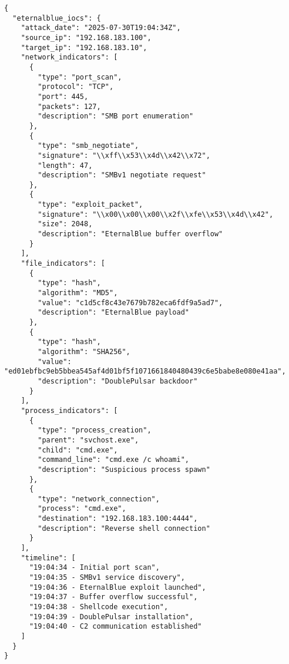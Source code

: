 \begin{lstlisting}[style=jsstyle,caption=IOCs extraits lors des tests EternalBlue]
{
  "eternalblue_iocs": {
    "attack_date": "2025-07-30T19:04:34Z",
    "source_ip": "192.168.183.100",
    "target_ip": "192.168.183.10",
    "network_indicators": [
      {
        "type": "port_scan",
        "protocol": "TCP",
        "port": 445,
        "packets": 127,
        "description": "SMB port enumeration"
      },
      {
        "type": "smb_negotiate",
        "signature": "\\xff\\x53\\x4d\\x42\\x72",
        "length": 47,
        "description": "SMBv1 negotiate request"
      },
      {
        "type": "exploit_packet",
        "signature": "\\x00\\x00\\x00\\x2f\\xfe\\x53\\x4d\\x42",
        "size": 2048,
        "description": "EternalBlue buffer overflow"
      }
    ],
    "file_indicators": [
      {
        "type": "hash",
        "algorithm": "MD5",
        "value": "c1d5cf8c43e7679b782eca6fdf9a5ad7",
        "description": "EternalBlue payload"
      },
      {
        "type": "hash", 
        "algorithm": "SHA256",
        "value": "ed01ebfbc9eb5bbea545af4d01bf5f1071661840480439c6e5babe8e080e41aa",
        "description": "DoublePulsar backdoor"
      }
    ],
    "process_indicators": [
      {
        "type": "process_creation",
        "parent": "svchost.exe",
        "child": "cmd.exe",
        "command_line": "cmd.exe /c whoami",
        "description": "Suspicious process spawn"
      },
      {
        "type": "network_connection",
        "process": "cmd.exe",
        "destination": "192.168.183.100:4444",
        "description": "Reverse shell connection"
      }
    ],
    "timeline": [
      "19:04:34 - Initial port scan",
      "19:04:35 - SMBv1 service discovery", 
      "19:04:36 - EternalBlue exploit launched",
      "19:04:37 - Buffer overflow successful",
      "19:04:38 - Shellcode execution",
      "19:04:39 - DoublePulsar installation",
      "19:04:40 - C2 communication established"
    ]
  }
}
\end{lstlisting}

